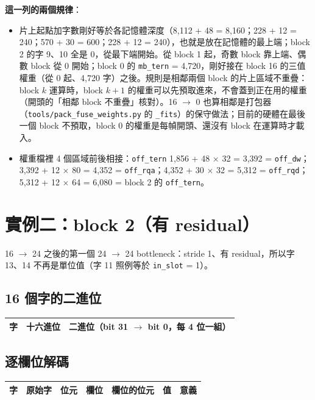 \documentclass[10pt,a4paper]{article}
\newcommand{\f}[1]{\texttt{#1}}
\begin{document}
\textbf{這一列的兩個規律}：
\begin{itemize}
\item 片上起點加字數剛好等於各記憶體深度（8,112 + 48 = 8,160；228 + 12 = 240；570 + 30 = 600；228 + 12 = 240），也就是放在記憶體的最上端；block 2 的字 9、10 全是 0，從最下端開始。從 block 1 起，奇數 block 靠上端、偶數 block 從 0 開始；block 0 的 \f{mb\_tern} = 4,720，剛好接在 block 16 的三值權重（從 0 起、4,720 字）之後。規則是相鄰兩個 block 的片上區域不重疊：block $k$ 運算時，block $k+1$ 的權重可以先預取進來，不會蓋到正在用的權重（開頭的「相鄰 block 不重疊」核對）。16 $\rightarrow$ 0 也算相鄰是打包器（\f{tools/pack\_fuse\_weights.py} 的 \f{\_fits}）的保守做法；目前的硬體在最後一個 block 不預取，block 0 的權重是每幀開頭、還沒有 block 在運算時才載入。
\item 權重檔裡 4 個區域前後相接：\f{off\_tern} 1,856 + 48 $\times$ 32 = 3,392 = \f{off\_dw}；3,392 + 12 $\times$ 80 = 4,352 = \f{off\_rqa}；4,352 + 30 $\times$ 32 = 5,312 = \f{off\_rqd}；5,312 + 12 $\times$ 64 = 6,080 = block 2 的 \f{off\_tern}。
\end{itemize}

\newpage
\section{實例二：block 2（有 residual）}
16 $\rightarrow$ 24 之後的第一個 24 $\rightarrow$ 24 bottleneck：stride 1、有 residual，所以字 13、14 不再是單位值（字 11 照例等於 \f{in\_slot} = 1）。

\subsection*{16 個字的二進位}
\begin{tabular}{@{}r c l@{}}
\toprule
字 & 十六進位 & 二進位（bit 31 $\rightarrow$ bit 0，每 4 位一組） \\
\midrule

\end{tabular}

\subsection*{逐欄位解碼}
\footnotesize
\begin{longtable}{@{}r c c L{20mm} L{31mm} r L{58mm}@{}}
\toprule
字 & 原始字 & 位元 & 欄位 & 欄位的位元 & 值 & 意義 \\
\midrule
\endhead

\end{longtable}
\normalsize
\end{document}
